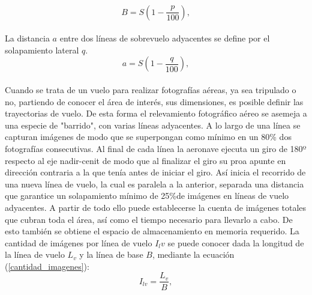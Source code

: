 \\
\begin{equation}
	B=S(1-\frac{p}{100}),\label{linea_de_base}
\end{equation}
\\
La distancia $a$ entre dos líneas de sobrevuelo adyacentes se define por el solapamiento lateral $q$.
\\
\begin{equation}
	a=S(1-\frac{q}{100}),\label{distancia_adyacente}
\end{equation}
\\
Cuando se trata de un vuelo para realizar fotografías aéreas, ya sea tripulado o no, partiendo de conocer el área de interés, sus dimensiones, es posible definir las trayectorias de vuelo. De esta forma el relevamiento fotográfico aéreo se asemeja a una especie de "barrido", con varias líneas adyacentes. A lo largo de una línea se capturan imágenes de modo que se superpongan como mínimo en un 80\% dos fotografías consecutivas. Al final de cada línea la aeronave ejecuta un giro de 180º respecto al eje nadir-cenit de modo que al finalizar el giro su proa apunte en dirección contraria a la que tenía antes de iniciar el giro. Así inicia el recorrido de una nueva línea de vuelo, la cual es paralela a la anterior, separada una distancia que garantice un solapamiento mínimo de 25\%de imágenes en líneas de vuelo adyacentes. A partir de todo ello puede establecerse la cuenta de imágenes totales que cubran toda el área, así como el tiempo necesario para llevarlo a cabo. De esto también se obtiene el espacio de almacenamiento en memoria requerido.
La cantidad de imágenes por línea de vuelo $I_lv$ se puede conocer dada la longitud de la línea de vuelo $L_v$ y la línea de base $B$, mediante la ecuación (\ref{cantidad_imagenes}):
\\
\begin{equation}
	I_{lv}=\frac{L_v}{B},\label{cantidad_imagenes}
\end{equation}
\\
